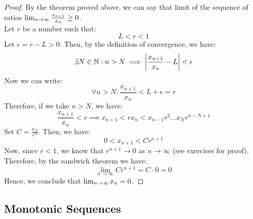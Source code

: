 \documentclass[openany]{book}
\begin{document}
\begin{proof}
    By the theorem proved above, we can say that limit of the sequence of ratios $\lim_{n \to \infty} \frac{x_{n+1}}{x_n} \geq 0$. \\
    Let $r$ be a number such that: $$L < r < 1$$
    Let $\epsilon = r-L > 0$. Then, by the definition of convergence, we have:
    $$\exists N \in \mathbb{N}: n > N \implies \left|\frac{x_{n+1}}{x_n} - L\right| < \epsilon$$
    Now we can write:
    $$\forall n > N: \frac{x_{n+1}}{x_n} < L + \epsilon = r$$
    Therefore, if we take $n > N$, we have:
    $$\frac{x_{n+1}}{x_n} < r \implies x_{n+1} < r x_n < x_{n-1}r^2 ... x_N r^{n - N +1}$$
    Set $C = \frac{x_N}{r^N}$. Then, we have:
    $$0< x_{n+1} < C r^{n+1}$$
    Now, since $r < 1$, we know that $r^{n+1} \rightarrow 0$ as $n \rightarrow \infty$ (see exercises for proof). Therefore, by the sandwich theorem we have:
    $$\lim_{n \to \infty} C r^{n+1} = C \cdot 0 = 0$$
    Hence, we conclude that $\lim_{n \to \infty} x_n = 0$. 
\end{proof}
\subsection{Monotonic Sequences}
\end{document}
